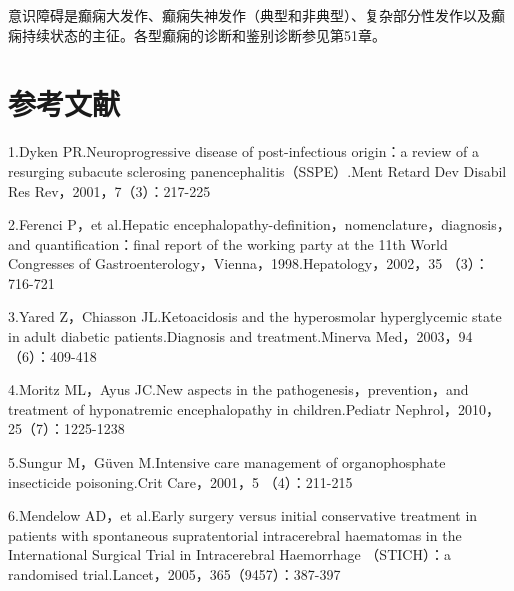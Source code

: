 意识障碍是癫痫大发作、癫痫失神发作（典型和非典型）、复杂部分性发作以及癫痫持续状态的主征。各型癫痫的诊断和鉴别诊断参见第51章。

\protect\hypertarget{text00381.html}{}{}

\section{参考文献}

1.Dyken PR.Neuroprogressive disease of post-infectious origin：a review
of a resurging subacute sclerosing panencephalitis（SSPE）.Ment Retard
Dev Disabil Res Rev，2001，7（3）：217-225

2.Ferenci P，et al.Hepatic
encephalopathy-definition，nomenclature，diagnosis，and
quantification：final report of the working party at the 11th World
Congresses of Gastroenterology，Vienna，1998.Hepatology，2002，35
（3）：716-721

3.Yared Z，Chiasson JL.Ketoacidosis and the hyperosmolar hyperglycemic
state in adult diabetic patients.Diagnosis and treatment.Minerva
Med，2003，94（6）：409-418

4.Moritz ML，Ayus JC.New aspects in the pathogenesis，prevention，and
treatment of hyponatremic encephalopathy in children.Pediatr
Nephrol，2010，25（7）：1225-1238

5.Sungur M，Güven M.Intensive care management of organophosphate
insecticide poisoning.Crit Care，2001，5 （4）：211-215

6.Mendelow AD，et al.Early surgery versus initial conservative treatment
in patients with spontaneous supratentorial intracerebral haematomas in
the International Surgical Trial in Intracerebral Haemorrhage
（STICH）：a randomised trial.Lancet，2005，365（9457）：387-397

\protect\hypertarget{text00382.html}{}{}

